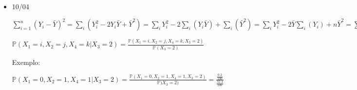 \documentclass[11pt,a4paper]{book}
\begin{document}
\begin{itemize}
		\begin{itemize}
			\item Transformação de V.A.s
			
			X é V.A.
			
			Y=g(X) é V.a.
			
			g(X) é função matemática.
			
			Distribuição de Y? 
			\begin{itemize}
				\item inverter g : Obter $F_y(y)=P(Y \leq~y)$ e deriva para obter a densidade $f_y(Y)=F'(y)$
				\item Y=g(X) e $X=g^{-1}(Y)=h(Y)$
				
				então $f_y(y)=f_x(h(y)).|h'(y)|$
				
				Exemplo:$ f_x(x) = \left.
				\begin{cases}
					0, & \mbox{se } x \ni (0,1)\\
					1, & \mbox{se } x \in (0,1)
				\end{cases}
				\right.
				$
				
				$Y=X^2\rightarrow X=\sqrt{Y}=h(Y)$
				
				Então:
				
				$f_y(y)=f_x(\sqrt{y})\times |\frac{d\sqrt{y}}{dy}|$
				
				Se quisermos $E(Y) = E(g(x)$
				\begin{enumerate}
					\item $E(Y) = \int y~f_Y(y)dy$ ($f_Y(y)$ é obtida de uma das duas maneiras anteriores)
					\item $=\int_{-\infty}^{\infty} g(x)\times~f_x(x)dx$
				\end{enumerate}
			\end{itemize} 
		\end{itemize}
		\item 10/04
			
		$\sum_{i=1}^{n}(Y_i-\bar{Y})^2=\sum_i(Y_i^2-2Y_i\bar{Y}+\bar{Y}^2)=\sum_iY_i^2-2\sum_i(Y_i\bar{Y})+\sum_i(\bar{Y}^2)=\sum_iY_i^2-2\bar{Y}\sum_i(Y_i)+n\bar{Y}^2=\sum_iY_i^2-2\bar{Y}.n\bar{Y}+n\bar{Y}^2=\sum_iY_i^2-n(\bar{Y}^2)$
		
		 $\mathbb{P}(X_1=i,X_2=j,X_4=k|X_3=2)=\frac{\mathbb{P}(X_1=i,X_2=j,X_4=k,X_3=2)}{\mathbb{P}(X_3=2)}$
		 
		 Exemplo:
		 
		 $\mathbb{P}(X_1=0,X_2=1,X_4=1|X_3=2)=\frac{\mathbb{P}(X_1=0,X_2=1,X_4=1,X_3=2)}{\mathbb{P})X_3=2)}=\frac{\frac{0.2}{100}}{\frac{32.4}{100}}$
		 

\end{itemize}
\end{document}
